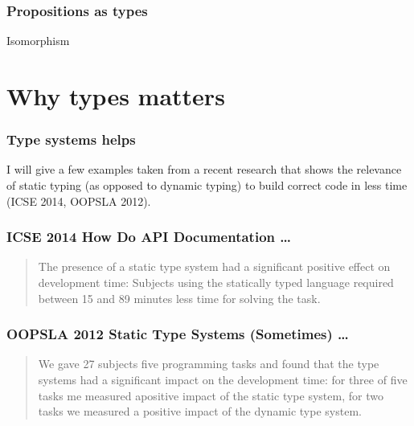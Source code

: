 \documentclass{beamer}
\begin{document}
\begin{frame}

    \frametitle{Propositions as types}

    \begin{center}
        
        {\Huge Isomorphism}

    \end{center}

\end{frame}



\section{Why types matters} %
\label{sec:Why types matters}

\begin{frame}

    \frametitle{Type systems helps}

    I will give a few examples taken from a recent research that shows
    the relevance of static typing (as opposed to dynamic typing) to
    build correct code in less time (ICSE 2014, OOPSLA 2012).

\end{frame}

\begin{frame}

    \frametitle{ICSE 2014 How Do API Documentation \dots}

    \begin{quotation}
    
        The presence of a static type system had a significant positive
        effect on development time: Subjects using the statically typed
        language required between 15 and 89 minutes less time for
        solving the task.
    
    \end{quotation}

\end{frame}

\begin{frame}

    \frametitle{OOPSLA 2012 Static Type Systems (Sometimes) \dots}

    \begin{quotation}
    
        We gave 27 subjects five programming tasks and found that the
        type systems had a significant impact on the development time:
        for three of five tasks me measured apositive impact of the
        static type system, for two tasks we measured a positive impact
        of the dynamic type system.
    
    \end{quotation}

\end{frame}
\end{document}
